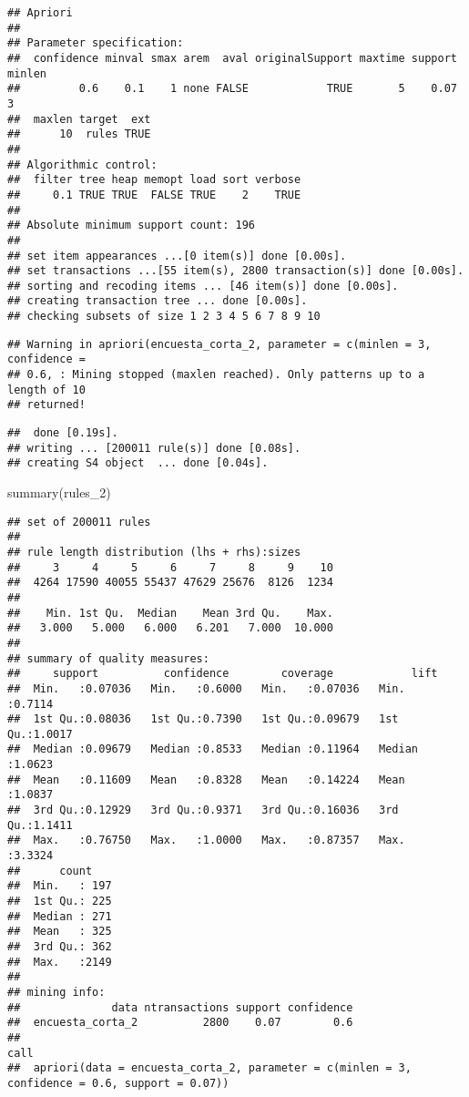 \documentclass[
]{article}
\newenvironment{Shaded}{\begin{snugshade}}{\end{snugshade}}
\newcommand{\FunctionTok}[1]{\textcolor[rgb]{0.00,0.00,0.00}{#1}}
\newcommand{\NormalTok}[1]{#1}
\begin{document}
\begin{verbatim}
## Apriori
## 
## Parameter specification:
##  confidence minval smax arem  aval originalSupport maxtime support minlen
##         0.6    0.1    1 none FALSE            TRUE       5    0.07      3
##  maxlen target  ext
##      10  rules TRUE
## 
## Algorithmic control:
##  filter tree heap memopt load sort verbose
##     0.1 TRUE TRUE  FALSE TRUE    2    TRUE
## 
## Absolute minimum support count: 196 
## 
## set item appearances ...[0 item(s)] done [0.00s].
## set transactions ...[55 item(s), 2800 transaction(s)] done [0.00s].
## sorting and recoding items ... [46 item(s)] done [0.00s].
## creating transaction tree ... done [0.00s].
## checking subsets of size 1 2 3 4 5 6 7 8 9 10
\end{verbatim}

\begin{verbatim}
## Warning in apriori(encuesta_corta_2, parameter = c(minlen = 3, confidence =
## 0.6, : Mining stopped (maxlen reached). Only patterns up to a length of 10
## returned!
\end{verbatim}

\begin{verbatim}
##  done [0.19s].
## writing ... [200011 rule(s)] done [0.08s].
## creating S4 object  ... done [0.04s].
\end{verbatim}

\begin{Shaded}
\begin{Highlighting}[]
\FunctionTok{summary}\NormalTok{(rules\_2)}
\end{Highlighting}
\end{Shaded}

\begin{verbatim}
## set of 200011 rules
## 
## rule length distribution (lhs + rhs):sizes
##     3     4     5     6     7     8     9    10 
##  4264 17590 40055 55437 47629 25676  8126  1234 
## 
##    Min. 1st Qu.  Median    Mean 3rd Qu.    Max. 
##   3.000   5.000   6.000   6.201   7.000  10.000 
## 
## summary of quality measures:
##     support          confidence        coverage            lift       
##  Min.   :0.07036   Min.   :0.6000   Min.   :0.07036   Min.   :0.7114  
##  1st Qu.:0.08036   1st Qu.:0.7390   1st Qu.:0.09679   1st Qu.:1.0017  
##  Median :0.09679   Median :0.8533   Median :0.11964   Median :1.0623  
##  Mean   :0.11609   Mean   :0.8328   Mean   :0.14224   Mean   :1.0837  
##  3rd Qu.:0.12929   3rd Qu.:0.9371   3rd Qu.:0.16036   3rd Qu.:1.1411  
##  Max.   :0.76750   Max.   :1.0000   Max.   :0.87357   Max.   :3.3324  
##      count     
##  Min.   : 197  
##  1st Qu.: 225  
##  Median : 271  
##  Mean   : 325  
##  3rd Qu.: 362  
##  Max.   :2149  
## 
## mining info:
##              data ntransactions support confidence
##  encuesta_corta_2          2800    0.07        0.6
##                                                                                           call
##  apriori(data = encuesta_corta_2, parameter = c(minlen = 3, confidence = 0.6, support = 0.07))
\end{verbatim}
\end{document}
